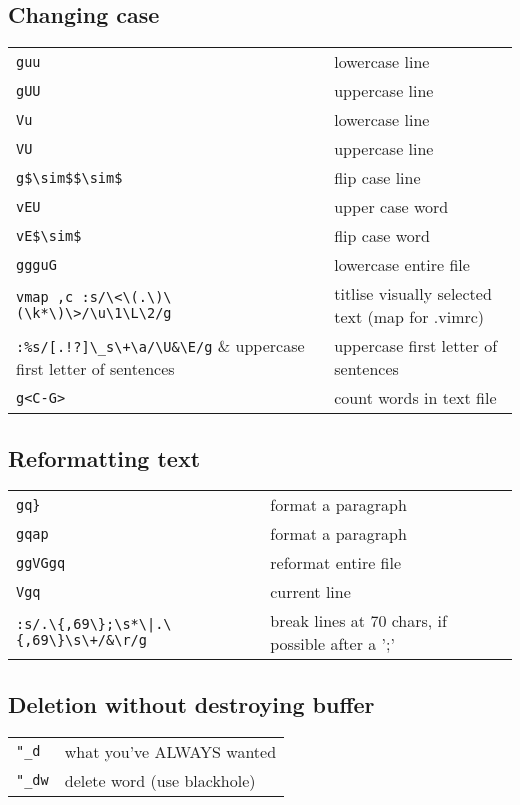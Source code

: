 \subsection{Changing case}
\begin{center}
\begin{longtable}{l|l}
\verb!guu! & lowercase line\\
\verb!gUU! & uppercase line\\
\verb!Vu! & lowercase line\\
\verb!VU! & uppercase line\\
\verb!g$\sim$$\sim$! & flip case line\\
\verb!vEU! & upper case word\\
\verb!vE$\sim$! & flip case word\\
\verb!ggguG! & lowercase entire file\\
\verb!vmap ,c :s/\<\(.\)\(\k*\)\>/\u\1\L\2/g! & titlise visually selected text (map for .vimrc)\\
\verb=:%s/[.!?]\_s\+\a/\U&\E/g= & uppercase first letter of sentences\\
\verb!g<C-G>! & count words in text file
\end{longtable}
\end{center}

\subsection{Reformatting text}
\begin{center}
\begin{longtable}{l|l}
 \verb!gq}! & format a paragraph\\
 \verb!gqap! & format a paragraph\\
 \verb!ggVGgq! & reformat entire file\\
 \verb!Vgq! & current line\\
 \verb!:s/.\{,69\};\s*\|.\{,69\}\s\+/&\r/g! & break lines at 70 chars, if possible after a ';'\\
\end{longtable}
\end{center}

\subsection{Deletion without destroying buffer}
\begin{center}
\begin{longtable}{l|l}
 \verb!"_d! & what you've ALWAYS wanted\\
 \verb!"_dw! & delete word (use blackhole)
\end{longtable}
\end{center}

